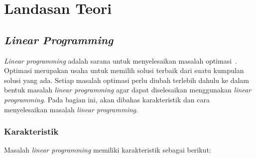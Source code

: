 \chapter{Landasan Teori}
\label{chap:teori}

\section{\textit{Linear Programming}}
\label{lp}

\textit{Linear programming} adalah sarana untuk menyelesaikan masalah optimasi~\cite{winston2004operations}. Optimasi merupakan usaha untuk memilih solusi terbaik dari suatu kumpulan solusi yang ada. Setiap masalah optimasi perlu diubah terlebih dahulu ke dalam bentuk masalah \textit{linear programming} agar dapat diselesaikan menggunakan \textit{linear programming}. Pada bagian ini, akan dibahas karakteristik dan cara menyelesaikan masalah \textit{linear programming}.

\subsection{Karakteristik}
Masalah \textit{linear programming} memiliki karakteristik sebagai berikut:


